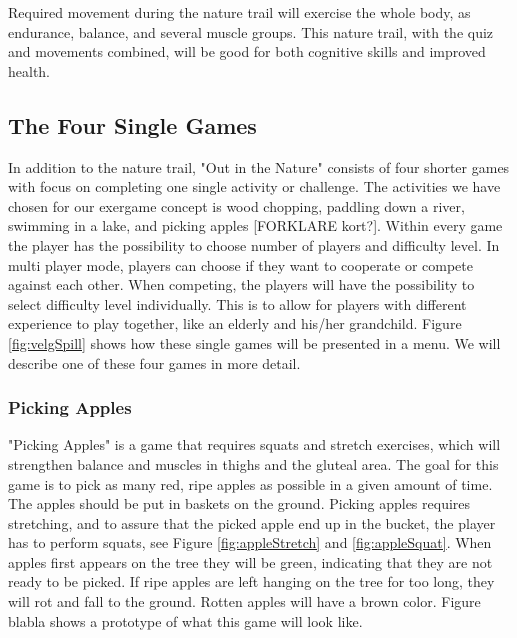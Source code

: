 Required movement during the nature trail will exercise the whole body, as endurance, balance, and several muscle groups. This nature trail, with the quiz and movements combined, will be good for both cognitive skills and improved health.       



\subsection{The Four Single Games}
In addition to the nature trail, "Out in the Nature" consists of four shorter games with focus on completing one single activity or challenge. The activities we have chosen for our exergame concept is wood chopping, paddling down a river, swimming in a lake, and picking apples [FORKLARE kort?]. Within every game the player has the possibility to choose number of players and difficulty level. In multi player mode, players can choose if they want to cooperate or compete against each other. When competing, the players will have the possibility to select difficulty level individually. This is to allow for players with different experience to play together, like an elderly and his/her grandchild. Figure \ref{fig:velgSpill} shows how these single games will be presented in a menu. We will describe one of these four games in more detail.

\subsubsection{Picking Apples}
"Picking Apples" is a game that requires squats and stretch exercises, which will strengthen balance and muscles in thighs and the gluteal area. The goal for this game is to pick as many red, ripe apples as possible in a given amount of time. The apples should be put in baskets on the ground. Picking apples requires stretching, and to assure that the picked apple end up in the bucket, the player has to perform squats, see Figure \ref{fig:appleStretch} and \ref{fig:appleSquat}. When apples first appears on the tree they will be green, indicating that they are not ready to be picked. If ripe apples are left hanging on the tree for too long, they will rot and fall to the ground. Rotten apples will have a brown color. Figure blabla shows a prototype of what this game will look like.  


